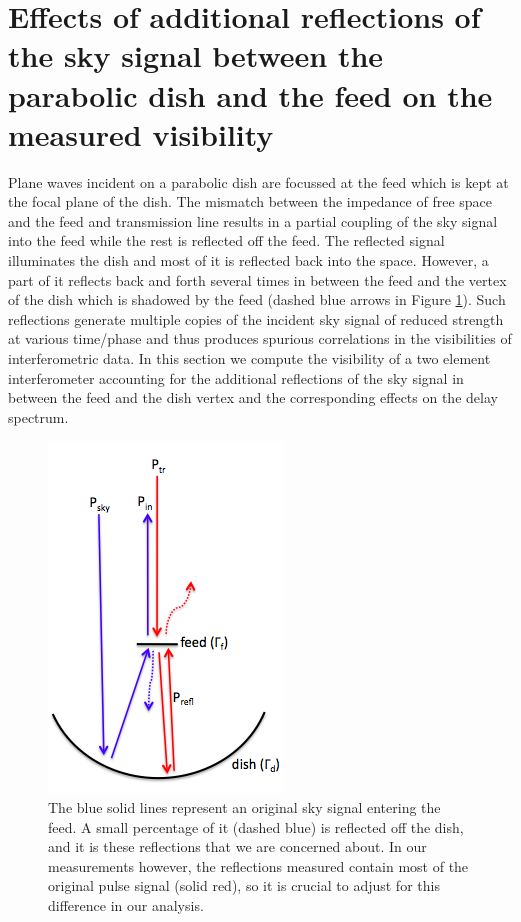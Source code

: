 \documentclass[12pt,preprint]{aastex}
\begin{document}
\section{Effects of additional reflections of the sky signal between the parabolic dish and the feed on the measured visibility}
 Plane waves incident on a parabolic dish are focussed at the feed which is kept at the focal plane of the dish. The mismatch between the impedance of free space and the feed and transmission line results in a partial coupling of the sky signal into the feed while the rest is reflected off the feed. The reflected signal illuminates the dish and most of it is reflected back into the space. However, a part of it reflects back and forth several times in between the feed and the vertex of the dish which is shadowed by the feed (dashed blue arrows in Figure \ref{fig:cartoon}). Such reflections generate multiple copies of the incident sky signal of reduced strength at various time/phase and thus produces spurious correlations in the visibilities of interferometric data. In this section we compute the visibility of a two element interferometer accounting for the additional reflections of the sky signal in between the feed and the dish vertex and the corresponding effects on the delay spectrum. 

\begin{figure}[ht!]
\centering
\includegraphics[totalheight=0.35\textheight]{plots/reflection_cartoon.png}
\caption{The blue solid lines represent an original sky signal entering the
feed. A small percentage of it (dashed blue) is reflected off the dish, and it
is these reflections that we are concerned about. In our measurements however,
the reflections measured contain most of the original pulse signal (solid red),
so it is crucial to adjust for this difference in our analysis.}
\label{fig:cartoon}
\end{figure}
\end{document}
